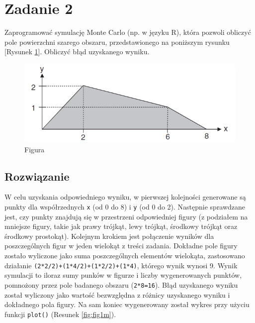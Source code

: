 \documentclass[a4paper,11pt,titlepage]{article}
\begin{document}
\newpage
\section{Zadanie 2}
Zaprogramować symulację Monte Carlo (np. w języku R), która pozwoli obliczyć pole powierzchni szarego obszaru, przedstawionego na poniższym rysunku [Rysunek \ref{fig:wykres2}]. Obliczyć błąd uzyskanego wyniku.

\begin{figure}[H]
\centering
\includegraphics[width=1\columnwidth]{img/zad2.PNG}
\caption{Figura}
\label{fig:wykres2}
\end{figure}

\subsection{Rozwiązanie}
W celu uzyskania odpowiedniego wyniku, w pierwszej kolejności generowane są punkty dla współrzednych \verb|x| (od 0 do 8) i \verb|y| (od 0 do 2). Następnie sprawdzane jest, czy punkty znajdują się w przestrzeni odpowiedniej figury (z podziałem na mniejsze figury, takie jak prawy trójkąt, lewy trójkąt, środkowy trójkąt oraz środkowy prostokąt). Kolejnym krokiem jest połączenie wyników dla poszczególnych figur w jeden wielokąt z treści zadania. Dokładne pole figury zostało wyliczone jako suma poszczególnych elementów wielokąta, zastosowano działanie \verb|(2*2/2)+(1*4/2)+(1*2/2)+(1*4)|, którego wynik wynosi 9. Wynik symulacji to iloraz sumy punków w figurze i liczby wygenerowanych punktów, pomnożony przez pole badanego obszaru (\verb|2*8=16|). Błąd uzyskanego wyniku został wyliczony jako wartość bezwzględna z różnicy uzyskanego wyniku i dokładnego pola figury. Na sam koniec wygenerowany został wykres przy użyciu funkcji \verb|plot()| (Resunek \ref{fig:fig1m}).
\end{document}
